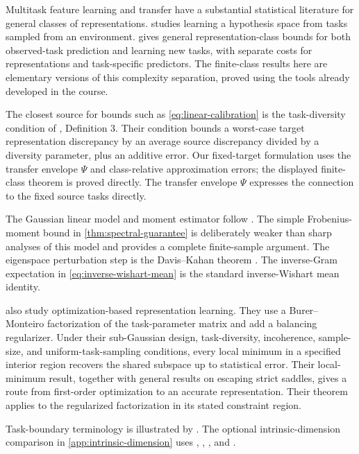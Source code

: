 \documentclass[11pt,twoside]{article}
\theoremstyle{definition}
\theoremstyle{remark}
\begin{document}
Multitask feature learning and transfer have a substantial statistical
literature for general classes of representations.
\citet{baxter2000} studies learning a hypothesis space from tasks sampled
from an environment. \citet{maurer2016} gives general representation-class
bounds for both observed-task prediction and learning new tasks, with separate
costs for representations and task-specific predictors.
The finite-class results here are elementary versions of this complexity
separation, proved using the tools already developed in the course.

The closest source for bounds such as \cref{eq:linear-calibration} is the
task-diversity condition of \citet{tripuraneni2020}, Definition 3. Their
condition bounds a worst-case target representation discrepancy by an average
source discrepancy divided by a diversity parameter, plus an additive error.
Our fixed-target formulation uses the transfer envelope $\Psi$ and
class-relative approximation errors; the displayed finite-class theorem is
proved directly. The transfer envelope $\Psi$ expresses the connection to the
fixed source tasks directly.

The Gaussian linear model and moment estimator follow
\citet{tripuraneni2021}. The simple Frobenius-moment bound in
\cref{thm:spectral-guarantee} is deliberately weaker than sharp analyses of
this model and provides a complete finite-sample argument. The eigenspace
perturbation step is the Davis--Kahan theorem \citep{daviskahan1970}.
The inverse-Gram expectation in \cref{eq:inverse-wishart-mean} is the
standard inverse-Wishart mean identity.

\citet{tripuraneni2021} also study optimization-based representation
learning. They use a Burer--Monteiro factorization of the task-parameter
matrix and add a balancing regularizer. Under their sub-Gaussian design,
task-diversity, incoherence, sample-size, and uniform-task-sampling
conditions, every local minimum in a specified interior region recovers the
shared subspace up to statistical error. Their local-minimum result, together
with general results on escaping strict saddles, gives a route from first-order
optimization to an accurate representation. Their theorem applies to the
regularized factorization in its stated constraint region.

Task-boundary terminology is illustrated by \citet{aljundi2019}.
The optional intrinsic-dimension comparison in
\cref{app:intrinsic-dimension} uses \citet{kohler2026},
\citet{kpotufe2011}, \citet{kpotufe2013}, and \citet{farahmand2007}.
\end{document}
